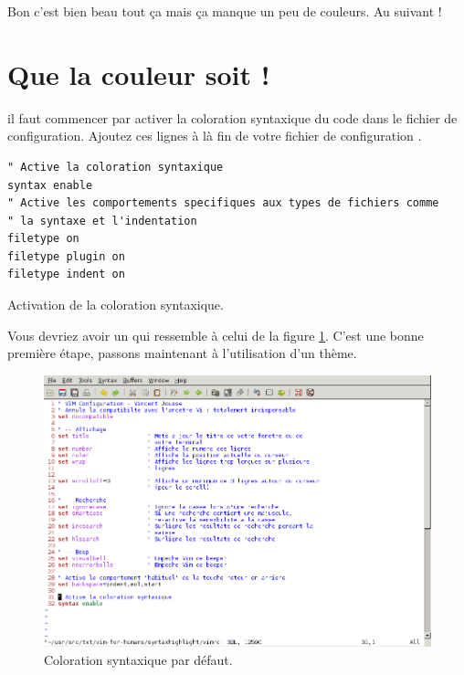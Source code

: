 Bon c'est bien beau tout ça mais ça manque un peu de couleurs. Au suivant !

\section{Que la couleur soit !}

 il faut commencer par activer la coloration syntaxique du code dans le fichier de configuration. Ajoutez ces lignes à là fin de votre fichier de configuration \vimrc.

\begin{listing}[H]
\begin{verbatim}
" Active la coloration syntaxique
syntax enable
" Active les comportements specifiques aux types de fichiers comme
" la syntaxe et l'indentation
filetype on
filetype plugin on
filetype indent on
\end{verbatim}
  \caption{Activation de la coloration syntaxique.}
  \label{lst:syntax-hl}
\end{listing}

Vous devriez avoir un \vim qui ressemble à celui de la figure \ref{fig:syntax-hl}. C'est une bonne première étape, passons maintenant à l'utilisation d'un thème.

\begin{figure}%
  \includegraphics[width=\linewidth]{graphics/vim-syntax-hl.png}
  \caption{Coloration syntaxique par défaut.}
  \label{fig:syntax-hl}
\end{figure}


